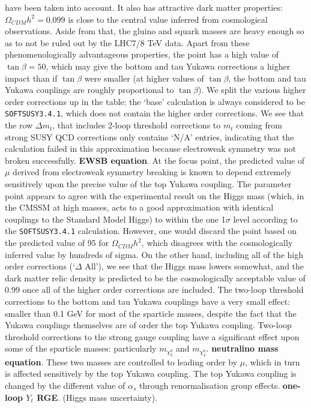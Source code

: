 \documentclass[final,3p,times,pdflatex]{elsarticle}
\begin{document}
have been taken into account.
It also has attractive dark matter properties: $\Omega_{CDM} h^2=0.099$ is
close to the central value inferred from cosmological observations. Aside from
that, the gluino and squark masses are heavy enough so as to not be ruled out
by the LHC7/8 TeV data. Apart from these phenomenologically advantageous
properties, the point has a high value of $\tan \beta=50$, which may give the 
bottom and tau Yukawa corrections a higher impact than if $\tan \beta$ were
smaller (at higher values of $\tan \beta$, the bottom and tau Yukawa couplings
are roughly proportional to $\tan \beta$).
We split the various higher order corrections up in
the table: the `base' calculation is always considered to be {\tt
  SOFTSUSY3.4.1}, which does not contain the higher order corrections. 
We see that the row $\Delta m_t$, that includes 2-loop threshold corrections
to $m_t$ coming from strong SUSY QCD corrections only contains `N/A' entries,
indicating that the calculation failed in this approximation because
electroweak symmetry was not broken successfully. {\bf EWSB equation}.
At the focus point,
the predicted value of $\mu$ derived from electroweak symmetry breaking is
known to 
depend extremely sensitively upon the precise value of the top Yukawa
coupling. 
The parameter point appears to agree with the experimental result on the Higgs
mass (which, in the CMSSM at high masses, acts to a good approximation with
identical couplings to the Standard Model Higgs)
to within the one 1$\sigma$ level according to the {\tt SOFTSUSY3.4.1}
calculation. However, one would discard the point based on the predicted value
of 95 for $\Omega_{CDM} h^2$, which disagrees with the cosmologically inferred
value by hundreds of sigma. On the other hand, including all of the high order
corrections (`$\Delta$ All'), we see that the Higgs mass lowers somewhat, and
the dark matter 
relic density is predicted to be the cosmologically acceptable value of 0.99
once all of the higher order corrections are included.
The two-loop threshold corrections to the bottom and tau Yukawa couplings 
have a very small effect: smaller than 0.1 GeV for most of the sparticle
masses, despite the fact that the Yukawa couplings themselves are of order the
top Yukawa coupling. 
Two-loop threshold corrections to the strong gauge coupling have a significant
effect upon some of the sparticle masses: particularly $m_{\chi_3^0}$ and
$m_{\chi_4^0}$. {\bf neutralino mass equation}.
These two masses are controlled to leading order by $\mu$,
which in turn is affected sensitively by the top Yukawa coupling. 
The top Yukawa coupling is changed by the different value of $\alpha_s$
through renormalisation group effects. {\bf one-loop $Y_t$ RGE}.
(Higgs mass uncertainty).
\end{document}
